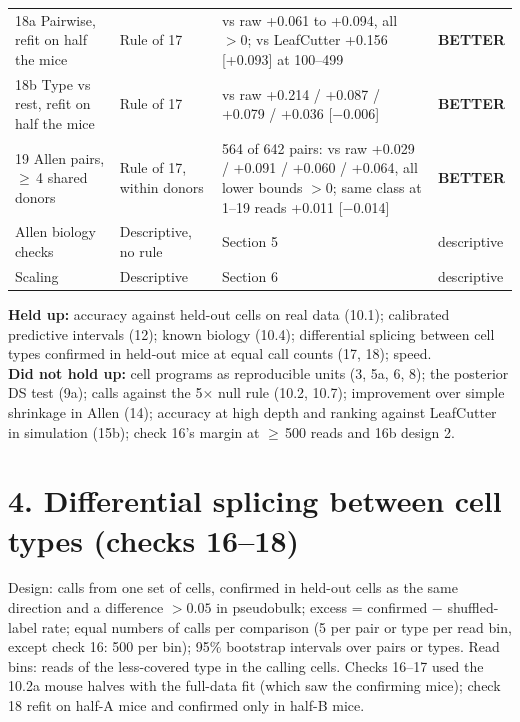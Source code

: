 \documentclass[10pt]{article}
\newcommand{\m}{$-$}
\newcommand{\gee}{$\geq$\,}
\begin{document}
\begin{longtable}{L{25mm}L{44mm}L{68mm}L{24mm}}
18a Pairwise, refit on half the mice & Rule of 17 & vs raw +0.061 to +0.094, all $>0$; vs LeafCutter +0.156 [+0.093] at 100--499 & \textbf{BETTER} \\
18b Type vs rest, refit on half the mice & Rule of 17 & vs raw +0.214 / +0.087 / +0.079 / +0.036 [\m0.006] & \textbf{BETTER} \\
19 Allen pairs, \gee4 shared donors & Rule of 17, within donors & 564 of 642 pairs: vs raw +0.029 / +0.091 / +0.060 / +0.064, all lower bounds $>0$; same class at 1--19 reads +0.011 [\m0.014] & \textbf{BETTER} \\
Allen biology checks & Descriptive, no rule & Section 5 & descriptive \\
Scaling & Descriptive & Section 6 & descriptive \\
\bottomrule
\end{longtable}
\normalsize

\textbf{Held up:} accuracy against held-out cells on real data (10.1); calibrated predictive intervals (12); known biology
(10.4); differential splicing between cell types confirmed in held-out mice at equal call counts (17, 18); speed.\\
\textbf{Did not hold up:} cell programs as reproducible units (3, 5a, 6, 8); the posterior DS test (9a); calls against the
5$\times$ null rule (10.2, 10.7); improvement over simple shrinkage in Allen (14); accuracy at high depth and ranking against
LeafCutter in simulation (15b); check 16's margin at \gee500 reads and 16b design 2.

\clearpage
\section*{4. Differential splicing between cell types (checks 16--18)}
Design: calls from one set of cells, confirmed in held-out cells as the same direction and a difference $>0.05$ in
pseudobulk; excess = confirmed $-$ shuffled-label rate; equal numbers of calls per comparison (5 per pair or type per read
bin, except check 16: 500 per bin); 95\% bootstrap intervals over pairs or types. Read bins: reads of the less-covered type
in the calling cells. Checks 16--17 used the 10.2a mouse halves with the full-data fit (which saw the confirming mice);
check 18 refit on half-A mice and confirmed only in half-B mice.
\end{document}
